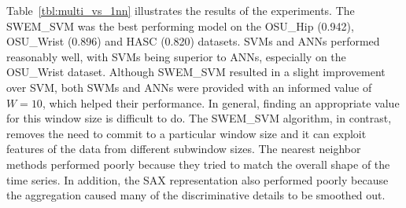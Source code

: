 \documentclass[letterpaper]{article}
\begin{document}


Table~\ref{tbl:multi_vs_1nn} illustrates the results of the experiments. The SWEM\_SVM was the best performing model on the OSU\_Hip (0.942), OSU\_Wrist (0.896) and HASC (0.820) datasets. SVMs and ANNs performed reasonably well, with SVMs being superior to ANNs, especially on the OSU\_Wrist dataset. Although SWEM\_SVM resulted in a slight improvement over SVM, both SWMs and ANNs were provided with an informed value of $W=10$, which helped their performance. In general, finding an appropriate value for this window size is difficult to do. The SWEM\_SVM algorithm, in contrast, removes the need to commit to a particular window size and it can exploit features of the data from different subwindow sizes. The nearest neighbor methods performed poorly because they tried to match the overall shape of the time series. In addition, the SAX representation also performed poorly because the aggregation caused many of the discriminative details to be smoothed out. 
\end{document}
